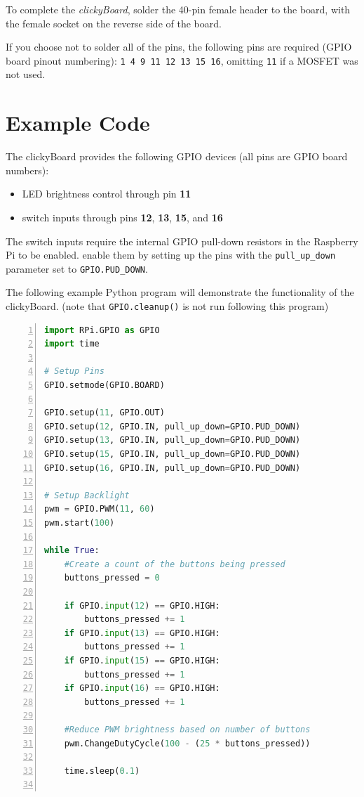 \documentclass[10pt, a4paper, onesided]{article}
\begin{document}
		To complete the \textit{clickyBoard}, solder the 40-pin female header to the board, with the female socket on the reverse side of the board.
		
		If you choose not to solder all of the pins, the following pins are required (GPIO board pinout numbering): 
		\texttt{1 4 9 11 12 13 15 16}, omitting \texttt{11} if a MOSFET was not used.


\newpage
\section{Example Code}

The clickyBoard provides the following GPIO devices (all pins are GPIO board numbers):

\begin{itemize}[nosep]
	\item LED brightness control through pin \textbf{11}
	\item switch inputs through pins \textbf{12}, \textbf{13}, \textbf{15}, and \textbf{16}
\end{itemize}

The switch inputs require the internal GPIO pull-down resistors in the Raspberry Pi to be enabled. enable them by setting up the pins with the \texttt{pull\_up\_down} parameter set to \texttt{GPIO.PUD\_DOWN}.

The following example Python program will demonstrate the functionality of the clickyBoard. (note that \texttt{GPIO.cleanup()} is not run following this program)

\begin{lstlisting}[language=Python,title=clickyboardtest.py,numbers=left]
import RPi.GPIO as GPIO
import time

# Setup Pins
GPIO.setmode(GPIO.BOARD)

GPIO.setup(11, GPIO.OUT)
GPIO.setup(12, GPIO.IN, pull_up_down=GPIO.PUD_DOWN)
GPIO.setup(13, GPIO.IN, pull_up_down=GPIO.PUD_DOWN)
GPIO.setup(15, GPIO.IN, pull_up_down=GPIO.PUD_DOWN)
GPIO.setup(16, GPIO.IN, pull_up_down=GPIO.PUD_DOWN)

# Setup Backlight
pwm = GPIO.PWM(11, 60)
pwm.start(100)

while True:
	#Create a count of the buttons being pressed
	buttons_pressed = 0
	
	if GPIO.input(12) == GPIO.HIGH:
		buttons_pressed += 1
	if GPIO.input(13) == GPIO.HIGH:
		buttons_pressed += 1
	if GPIO.input(15) == GPIO.HIGH:
		buttons_pressed += 1
	if GPIO.input(16) == GPIO.HIGH:
		buttons_pressed += 1
	
	#Reduce PWM brightness based on number of buttons
	pwm.ChangeDutyCycle(100 - (25 * buttons_pressed))
	
	time.sleep(0.1)
	
\end{lstlisting}
\end{document}
